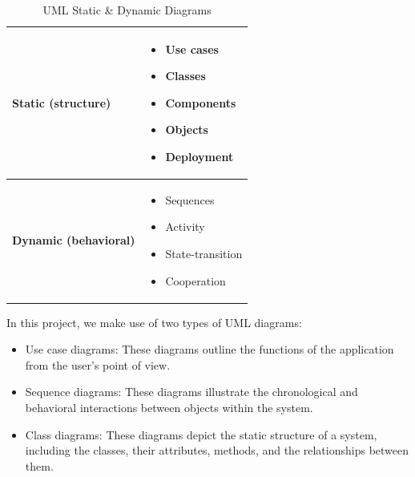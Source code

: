 \begin{table}[H]

   \begin{tabular}{|p{}|p{}|}
   \hline
     
        \begin{center}
            \textbf{Static (structure)}
        \end{center} & 
        \begin{itemize}
            \renewcommand\labelitemi{\textbf{\Huge .}}

            \item Use cases  
            \item Classes  
            \item Components  
            \item Objects
            \item Deployment

        \end{itemize}  \\   \hline

        
        \begin{center}
            \textbf{Dynamic (behavioral)}
        \end{center} & 
        \begin{itemize}
            \renewcommand\labelitemi{\textbf{\Huge .}}
            
            \item  Sequences  
            \item  Activity  
            \item  State-transition  
            \item  Cooperation

        \end{itemize}
        \\   \hline

        
\end{tabular}
    \caption{UML Static \& Dynamic Diagrams }
    \label{tab:UML_diagrams_list}
     \setlength{\abovecaptionskip}{0.25cm}
\end{table}

In this project, we make use of two types of UML diagrams:

\vspace{0.25cm}

\begin{itemize}
\renewcommand\labelitemi{\textbf{\Huge .}}
\item Use case diagrams: These diagrams outline the functions of the application from the user's point of view.
\item Sequence diagrams: These diagrams illustrate the chronological and behavioral interactions between objects within the system.
\item Class diagrams: These diagrams depict the static structure of a system, including the classes, their attributes, methods, and the relationships between them.
\end{itemize}

